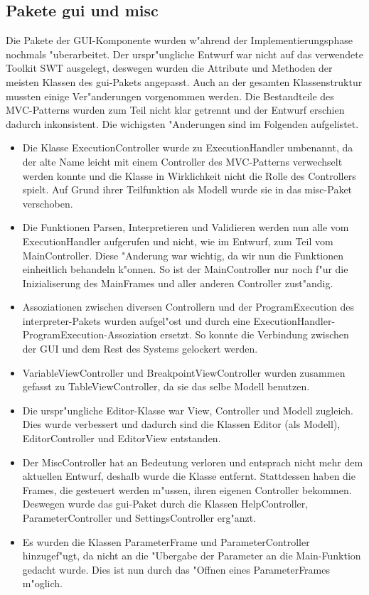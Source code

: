 \subsection{Pakete gui und misc}
Die Pakete der GUI-Komponente wurden w"ahrend der Implementierungsphase nochmals "uberarbeitet. Der urspr"ungliche Entwurf war nicht auf das verwendete Toolkit SWT ausgelegt, deswegen wurden die Attribute und Methoden der meisten Klassen des gui-Pakets angepasst. Auch an der gesamten Klassenstruktur mussten einige Ver"anderungen vorgenommen werden. Die Bestandteile des MVC-Patterns wurden zum Teil nicht klar getrennt und der Entwurf erschien dadurch inkonsistent. Die wichigsten "Anderungen sind im Folgenden aufgelistet. 
\begin{itemize}
\item Die Klasse ExecutionController wurde zu ExecutionHandler umbenannt, da der alte Name leicht mit einem Controller des MVC-Patterns verwechselt werden konnte und die Klasse in Wirklichkeit nicht die Rolle des Controllers spielt. Auf Grund ihrer Teilfunktion als Modell wurde sie in das misc-Paket verschoben.
\item Die Funktionen Parsen, Interpretieren und Validieren werden nun alle vom ExecutionHandler aufgerufen und nicht, wie im Entwurf, zum Teil vom MainController. Diese "Anderung war wichtig, da wir nun die Funktionen einheitlich behandeln k"onnen. So ist der MainController nur noch f"ur die Inizialiserung des MainFrames und aller anderen Controller zust"andig. 
\item Assoziationen zwischen diversen Controllern und der ProgramExecution des interpreter-Pakets wurden aufgel"ost und durch eine ExecutionHandler-ProgramExecution-Assoziation ersetzt. So konnte die Verbindung zwischen der GUI und dem Rest des Systems gelockert werden.
\item VariableViewController und BreakpointViewController wurden zusammen gefasst zu TableViewController, da sie das selbe Modell benutzen. 
\item Die urspr"ungliche Editor-Klasse war View, Controller und Modell zugleich. Dies wurde verbessert und dadurch sind die Klassen Editor (als Modell), EditorController und EditorView entstanden.
\item Der MiscController hat an Bedeutung verloren und entsprach nicht mehr dem aktuellen Entwurf, deshalb wurde die Klasse entfernt. Stattdessen haben die Frames, die gesteuert werden m"ussen, ihren eigenen Controller bekommen. Deswegen wurde das gui-Paket durch die Klassen HelpController, ParameterController und SettingsController erg"anzt.
\item Es wurden die Klassen ParameterFrame und ParameterController hinzugef"ugt, da nicht an die "Ubergabe der Parameter an die Main-Funktion gedacht wurde. Dies ist nun durch das "Offnen eines ParameterFrames m"oglich.
\end{itemize}
